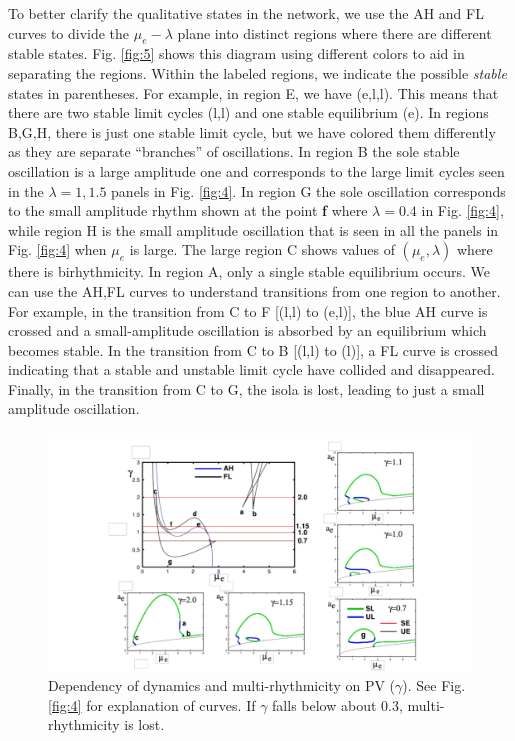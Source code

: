 \documentclass[10pt,letterpaper]{article}
\begin{document}
To better clarify the qualitative states in the network, we use the AH and FL curves to divide the $\mu_e-\lambda$ plane into distinct regions where there are different stable states. Fig. \ref{fig:5} shows this diagram using different colors to aid in separating the regions. Within the labeled regions, we indicate the possible {\em stable} states in parentheses.  For example, in region E, we have (e,l,l). This means that there are two stable limit cycles (l,l) and one stable equilibrium (e).  In regions B,G,H, there is just one stable limit cycle, but we have colored them differently as they are separate ``branches'' of oscillations. In region B the sole stable oscillation is a large amplitude one and corresponds to the large limit cycles seen in the $\lambda=1,1.5$ panels in Fig. \ref{fig:4}. In region G the sole oscillation corresponds to the small amplitude rhythm shown at the point {\bf f} where $\lambda=0.4$ in Fig. \ref{fig:4}, while region H is the small amplitude oscillation that is seen in all the panels in Fig. \ref{fig:4} when $\mu_e$ is large.  The large region C shows values of $(\mu_e,\lambda)$ where there is birhythmicity.  In region A, only a single stable equilibrium occurs. We can use the AH,FL curves to understand transitions from one region to another. For example, in the transition from C to F [(l,l) to (e,l)], the blue AH curve is crossed and a small-amplitude oscillation is absorbed by an equilibrium which becomes stable.  In the transition from C to B [(l,l) to (l)], a FL curve is crossed indicating that a stable and unstable limit cycle have collided and disappeared.  Finally, in the transition from C to G, the isola is lost, leading to just a small amplitude oscillation.








\begin{figure}
\includegraphics[width=.9\textwidth]{afig7.pdf}
\caption{Dependency of dynamics and multi-rhythmicity on PV ($\gamma$). See Fig. \ref{fig:4} for explanation of curves. If $\gamma$ falls below about $0.3$, multi-rhythmicity is lost. }
\label{fig:6}
\end{figure}
\end{document}

